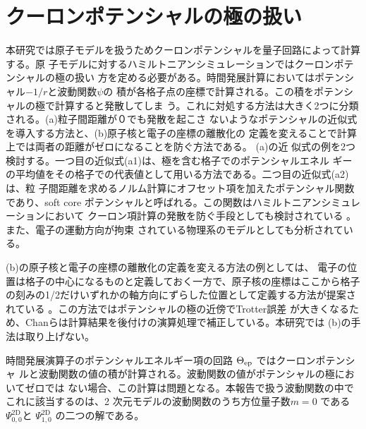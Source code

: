 \documentclass[fontsize=11pt]{jlreq}
\begin{document}
\section{クーロンポテンシャルの極の扱い}
\label{sec:coulomb-potential-handling}
本研究では原子モデルを扱うためクーロンポテンシャルを量子回路によって計算する。原
子モデルに対するハミルトニアンシミュレーションではクーロンポテンシャルの極の扱い
方を定める必要がある。時間発展計算においてはポテンシャル$-1/r$と波動関数$\psi$の
積が各格子点の座標で計算される。この積をポテンシャルの極で計算すると発散してしま
う。これに対処する方法は大きく2つに分類される。(a)粒子間距離が０でも発散を起こさ
ないようなポテンシャルの近似式を導入する方法と、(b)原子核と電子の座標の離散化の
定義を変えることで計算上では両者の距離がゼロになることを防ぐ方法である。 (a)の近
似式の例を2つ検討する。一つ目の近似式(a1)は、極を含む格子でのポテンシャルエネル
ギーの平均値をその格子での代表値として用いる方法である。二つ目の近似式(a2)は、粒
子間距離を求めるノルム計算にオフセット項を加えたポテンシャル関数であり、soft
core ポテンシャルと呼ばれる。この関数はハミルトニアンシミュレーションにおいて
クーロン項計算の発散を防ぐ手段としても検討されている
\cite{Childs2022quantumsimulationof,Kivlichan_2017}。また、電子の運動方向が拘束
されている物理系のモデルとしても分析されている\cite{Hall2009.PhysRevA.80.032507,
Fernandez_1991, LiChen2021.doi:10.1021/acs.jpca.1c00698}。

(b)の原子核と電子の座標の離散化の定義を変える方法の例としては、
電子の位置は格子の中心になるものと定義しておく一方で、原子核の座標はここから格子
の刻みの1/2だけいずれかの軸方向にずらした位置として定義する方法が提案されている
\cite{Chan2023.sciadv.abo7484}。この方法ではポテンシャルの極の近傍でTrotter誤差
が大きくなるため、Chanらは計算結果を後付けの演算処理で補正している。本研究では
(b)の手法は取り上げない。

時間発展演算子のポテンシャルエネルギー項の回路 $\Theta_{\mathrm{ep}}$ ではクーロンポテンシャ
ルと波動関数の値の積が計算される。波動関数の値がポテンシャルの極においてゼロでは
ない場合、この計算は問題となる。本報告で扱う波動関数の中でこれに該当するのは、2
次元モデルの波動関数のうち方位量子数$m=0$ である$\Psi_{0,0}^{\mathrm{2D}}$と
$\Psi_{1,0}^{\mathrm{2D}}$ の二つの解である。
\end{document}
